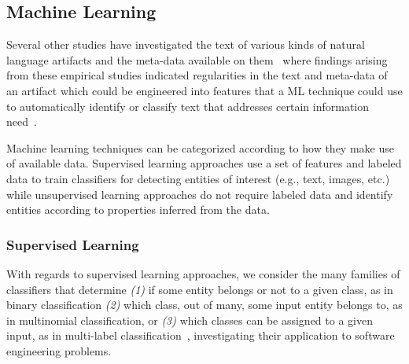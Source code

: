 \subsection{Machine Learning }
\label{cp2:machine-learning}



Several other studies have investigated the text 
of various kinds of natural language artifacts and 
the meta-data available on them~\cite{Ko2006, Maalej2013, Arya2019}
where findings arising from these empirical studies
indicated regularities in the text and meta-data of 
an artifact which could be engineered into 
features that a  \acf{ML} technique could use to automatically identify or classify
text that addresses certain information need~\cite{Bavota2016}. 



Machine learning techniques can be categorized 
according to how they make use of available data. 
Supervised learning approaches use a set of features and labeled data
to train classifiers for detecting entities of interest (e.g., text, images, etc.)
while unsupervised learning approaches do not require labeled data and 
identify entities according to properties inferred from the data.



\subsubsection{Supervised Learning }
\label{cp2:supervised}


With regards to supervised learning approaches, 
we consider the many families of classifiers that 
determine
\textit{(1)} if some entity belongs or not to a given class, as in binary classification
\textit{(2)} which class, out of many, some input entity belongs to, as in multinomial classification, or
\textit{(3)} which classes can be assigned to a given input, as in multi-label classification~\cite{alpaydin2020ml},
 investigating their application to software engineering problems.






